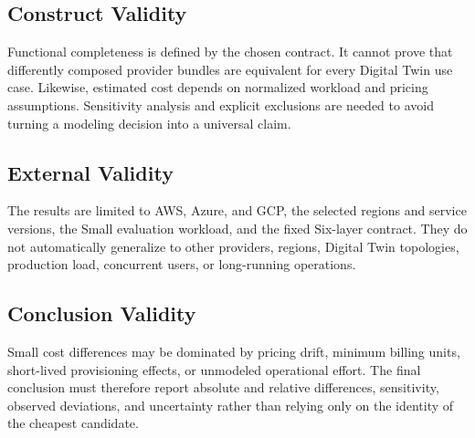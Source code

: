\subsection{Construct Validity}

Functional completeness is defined by the chosen contract. It cannot prove
that differently composed provider bundles are equivalent for every Digital
Twin use case. Likewise, estimated cost depends on normalized workload and
pricing assumptions. Sensitivity analysis and explicit exclusions are needed
to avoid turning a modeling decision into a universal claim.

\subsection{External Validity}

The results are limited to AWS, Azure, and GCP, the selected regions and
service versions, the Small evaluation workload, and the fixed Six-layer
contract. They do not automatically generalize to other providers, regions,
Digital Twin topologies, production load, concurrent users, or long-running
operations.

\subsection{Conclusion Validity}

Small cost differences may be dominated by pricing drift, minimum billing
units, short-lived provisioning effects, or unmodeled operational effort. The
final conclusion must therefore report absolute and relative differences,
sensitivity, observed deviations, and uncertainty rather than relying only on
the identity of the cheapest candidate.
